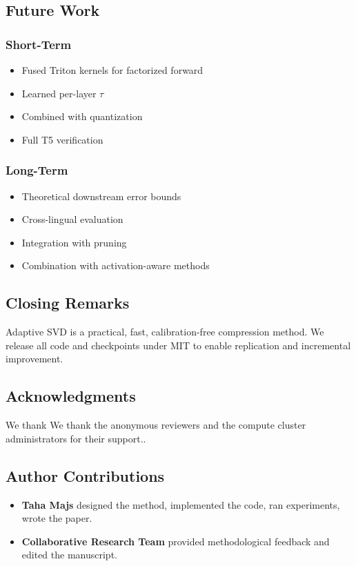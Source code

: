 \subsection{Future Work}

\subsubsection{Short-Term}
\begin{itemize}
\item Fused Triton kernels for factorized forward
\item Learned per-layer $\tau$
\item Combined with quantization
\item Full T5 verification

\end{itemize}
\subsubsection{Long-Term}
\begin{itemize}
\item Theoretical downstream error bounds
\item Cross-lingual evaluation
\item Integration with pruning
\item Combination with activation-aware methods

\end{itemize}
\subsection{Closing Remarks}

Adaptive SVD is a practical, fast, calibration-free compression method. We 
release all code and checkpoints under MIT to enable replication 
and incremental improvement.

\subsection{Acknowledgments}

We thank We thank the anonymous reviewers and the compute cluster administrators for their support..

\subsection{Author Contributions}

\begin{itemize}
\item \textbf{Taha Majs} designed the method, implemented the code, ran experiments,
  wrote the paper.
\item \textbf{Collaborative Research Team} provided methodological feedback and edited the manuscript.

\end{itemize}
